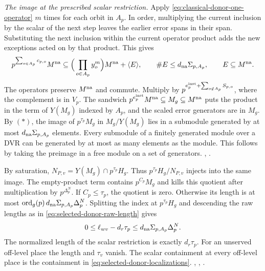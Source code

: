 \emph{The image at the prescribed scalar restriction.}
Apply \eqref{eq:classical-donor-one-operator} \(m\) times for each
orbit in \(A_p\). In order, multiplying the current inclusion
by the scalar of the next step leaves the earlier error spans in
their span. Substituting the next inclusion within the current
operator product adds the new exceptions acted on by that product.
This gives
\[
 p^{\sum_{o\in A_p}c_{p,o}}M^{\rm na}
     \subseteq \Big(\prod_{o\in A_p} y_o^m\Big) M^{\rm na}
                          +\langle E\rangle,
 \qquad \#E\le d_{\rm na}\Sigma_{p,A_p},\qquad E\subseteq M^{\rm na}.
\]
The operators preserve \(M^{\rm na}\) and commute. Multiply by
\(p^{e_p^{\rm inst}+\sum_{o\notin A_p}S_{p,o}}\), where the
complement is in \(V_p\). The sandwich
\(p^{e_p^{\rm inst}} M^{\rm na}\subseteq M_g\subseteq M^{\rm na}\)
puts the product in the term of \(Y(M_g)\) indexed by \(A_p\), and
the scaled error generators are in \(M_g\). By \((*)\), the image
of \(p^{\tau_p}M_g\) in \(M_g/Y(M_g)\) lies in a submodule generated
by at most \(d_{\rm na}\Sigma_{p,A_p}\) elements. Every submodule
of a finitely generated module over a DVR can be generated by at
most as many elements as the module. This follows by taking
the preimage in a free module on a set of generators.
,
.

By saturation, \(N_{P,v}=Y(M_g)\cap p^{\tau_p}H_g\). Thus
\(p^{\tau_p}H_g/N_{P,v}\) injects into the same image. The
empty-product term contains \(p^{C_p}M_g\) and kills this
quotient after multiplication by \(p^{\Delta_p^N}\). If
\(C_p\le\tau_p\), the quotient is zero. Otherwise its length is
at most \(\operatorname{ord}_g(p)\, d_{\rm na}
\Sigma_{p,A_p}\Delta_p^N\). Splitting the index at \(p^{\tau_p}H_g\)
and descending the raw lengths as in
\eqref{eq:selected-donor-raw-length} gives
\begin{equation}
\label{eq:classical-donor-length}
 0\le \ell_{wv}-d_r\tau_p
       \le d_{\rm na}\Sigma_{p,A_p}\Delta_p^N .
\end{equation}
The normalized length of the scalar restriction is exactly
\(d_r\tau_p\). For an unserved off-level place the length and
\(\tau_v\) vanish. The scalar containment at every off-level
place is the containment in \eqref{eq:selected-donor-localizations}.
,
,
.

